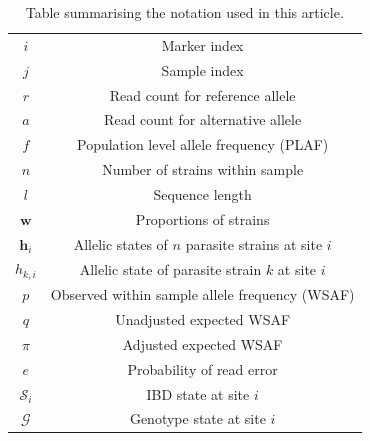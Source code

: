 \documentclass[9pt]{article}
\begin{document}
\begin{table}[htb]\centering
\begin{tabular}{c|c}\hline
$i$              & Marker index\\
$j$              & Sample index \\
$r$              & Read count for reference allele \\
$a$              & Read count for alternative allele \\
$f$              & Population level allele frequency (PLAF) \\
$n$              & Number of strains within sample \\
$l$              & Sequence length \\
$\mathbf{w}$      & Proportions of strains \\
$\mathbf{h}_{i}$ & Allelic states of $n$ parasite strains at site $i$ \\
$h_{k,i}$   & Allelic state of parasite strain $k$ at site $i$\\
$p$              & Observed within sample allele frequency (WSAF) \\
$q$              & Unadjusted expected WSAF  \\
$\pi$            & Adjusted expected WSAF \\
$e$              & Probability of read error\\
$\mathcal{S}_{i}$ & IBD state at site $i$ \\
$\mathcal{G}$ & Genotype state at site $i$ \\
\hline
\end{tabular}
\vspace{.2cm}
\caption{Table summarising the notation used in this article.}\label{tab:notation}
\end{table}
\end{document}
